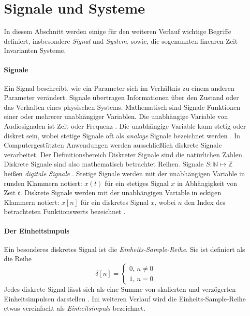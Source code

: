 \section{Signale und Systeme}
\label{sec:signals_and_systems}
In diesem Abschnitt werden einige für den weiteren Verlauf wichtige Begriffe definiert, insbesondere \textit{Signal} und \textit{System},
sowie, die sogenannten linearen Zeit-Invarianten Systeme.
\paragraph{Signale}
Ein Signal beschreibt, wie ein Parameter sich im Verhältnis zu einem anderen Parameter verändert.
Signale übertragen Informationen über den Zustand oder das Verhalten eines physischen Systems. Mathematisch sind Signale
Funktionen einer oder mehrerer unabhängiger Variablen. Die unabhängige Variable von Audiosignalen ist Zeit oder Frequenz \cite[Kap. 5]{smith1997}.
Die unabhängige Variable kann stetig
oder diskret sein, wobei stetige Signale oft als \textit{analoge} Signale bezeichnet werden \cite[Kap. 2]{oppenheim1999}. In Computergestützten Anwendungen werden 
ausschließlich diskrete Signale verarbeitet.
Der Definitionsbereich Diskreter Signale sind die natürlichen Zahlen. Diskrete Signale sind also mathematisch betrachtet Reihen. 
Signale $S:\mathbb{N}\mapsto\mathbb{Z}$ heißen \textit{digitale Signale} \cite[Kap. 2]{oppenheim1999}.
Stetige Signale werden mit der unabhängigen Variable in runden Klammern notiert:
$x(t)$ für ein stetiges Signal $x$ in Abhängigkeit von Zeit $t$.
Diskrete Signale werden mit der unabhängigen Variable in eckigen Klammern notiert: $x[n]$ für ein diskretes Signal $x$,
wobei $n$ den Index des betrachteten Funktionswerts bezeichnet \cite[Seite 9]{oppenheim1999}.
\paragraph{Der Einheitsimpuls}
Ein besonderes diskretes Signal ist die \textit{Einheits-Sample-Reihe}.
Sie ist definiert als die Reihe
\begin{equation}
    \delta[n]=
    \begin{cases}
        0,\,n\ne0\\
        1,\,n=0
    \end{cases}
\end{equation}
Jedes diskrete Signal lässt sich als eine Summe von skalierten und verzögerten Einheitsimpulsen darstellen \cite[Kap. 2, Seite 11]{oppenheim1999}.
Im weiteren Verlauf wird die Einheits-Sample-Reihe etwas vereinfacht als \textit{Einheitsimpuls} bezeichnet.
